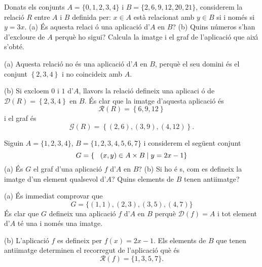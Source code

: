 \begin{exem}
Donats els conjunts $A=\{0,1,2,3,4\}$ i $B=\{2,6,9,12,20,21\}$, considerem
la relaci\'{o} $R$ entre $A$ i $B$ definida per: $x\in A$ est\`{a}
relacionat amb $y\in B$ si i nom\'{e}s si $y=3x$. (a) \'{E}s aquesta relaci%
\'{o} una aplicaci\'{o} d'$A$ en $B$? (b) Quins n\'{u}meros s'han d'excloure
de $A$ perqu\`{e} ho sigui? Calcula la imatge i el graf de l'aplicaci\'{o}
que aix\'{\i} s'obt\'{e}.
\end{exem}

\begin{solucio}
(a) Aquesta relaci\'{o} no \'{e}s una aplicaci\'{o} d'$A$ en $B$, perqu\`{e}
el seu domini \'{e}s el conjunt $\left\{ 2,3,4\right\} $ i no coincideix amb
$A$.

(b) Si excloem $0$ i $1$ d'$A$, llavors la relaci\'{o} defineix una aplicaci%
\'{o} de $\mathcal{D}(R)=\left\{ 2,3,4\right\} $ en $B$. \'{E}s clar que la
imatge d'aquesta aplicaci\'{o} \'{e}s%
\begin{equation*}
\mathcal{R}(R)=\left\{ 6,9,12\right\}
\end{equation*}
i el graf \'{e}s%
\begin{equation*}
\mathcal{G}(R)=\left\{ (2,6),(3,9),(4,12)\right\} \text{.}
\end{equation*}
\end{solucio}

\begin{exem}
Siguin $A=\{1,2,3,4\}$, $B=\{1,2,3,4,5,6,7\}$ i considerem el seg\"{u}ent
conjunt%
\begin{equation*}
G=\{\text{\thinspace}(x,y)\in A\times B\mid y=2x-1\}
\end{equation*}
(a) \'{E}s $G$ el graf d'una aplicaci\'{o} $f$ d'$A$ en $B$? (b) Si ho \'{e}%
s, com es defineix la imatge d'un element qualsevol d'$A$? Quins elements de
$B$ tenen antiimatge?
\end{exem}

\begin{solucio}
(a) \'{E}s immediat comprovar que%
\begin{equation*}
G=\{(1,1),(2,3),(3,5),(4,7)\}
\end{equation*}
\'{E}s clar que $G$ defineix una aplicaci\'{o} $f$ d'$A$ en $B$ perqu\`{e} $%
\mathcal{D}(f)=A$ i tot element d'$A$ t\'{e} una i nom\'{e}s una imatge.

(b) L'aplicaci\'{o} $f$ es defineix per $f(x)=2x-1$. Els elements de $B$ que
tenen antiimatge determinen el recorregut de l'aplicaci\'{o} qu\`{e} \'{e}s%
\begin{equation*}
\mathcal{R}(f)=\{1,3,5,7\}\text{.}
\end{equation*}
\end{solucio}

